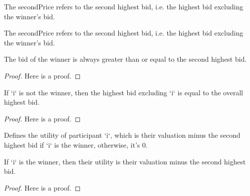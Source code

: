 \begin{definition}\label{secondPrice}
    \leanok
    The secondPrice refers to the second highest bid, i.e. the highest bid excluding the winner’s bid.
\end{definition}

\begin{definition}\label{winnerbid_ge_second}
    \leanok
    The secondPrice refers to the second highest bid, i.e. the highest bid excluding the winner’s bid.
\end{definition}

\begin{lemma}\label{maxBidExcluding_le_maxBid}
    \leanok
    The bid of the winner is always greater than or equal to the second highest bid.
\end{lemma}
\begin{proof}
    Here is a proof.
\end{proof}

\begin{lemma}\label{maxBidExcluding_eq_maxBid_if_loser}
    \leanok
    If `i` is not the winner, then the highest bid excluding `i` is equal to the overall highest bid.
\end{lemma}
\begin{proof}
    Here is a proof.
\end{proof}

\begin{definition}\label{Secondprice.utility}
    \leanok
    Defines the utility of participant `i`, which is their valuation minus the second highest bid if `i` is the winner, otherwise, it's 0.
\end{definition}

\begin{lemma}\label{Secondprice.utility_winner}
    \leanok
    If `i` is the winner, then their utility is their valuation minus the second highest bid.
\end{lemma}
\begin{proof}
    Here is a proof.
\end{proof}

